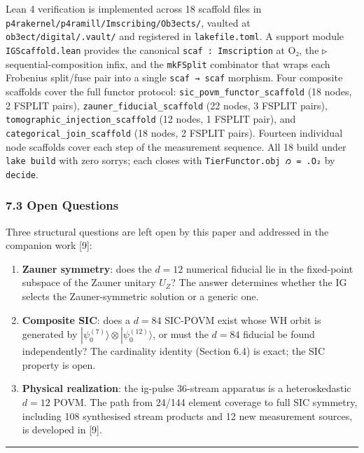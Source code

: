 Lean 4 verification is implemented across 18 scaffold files in
\texttt{p4rakernel/p4ramill/Imscribing/Ob3ects/}, vaulted at
\texttt{ob3ect/digital/.vault/} and registered in
\texttt{lakefile.toml}. A support module \texttt{IGScaffold.lean}
provides the canonical \texttt{scaf\ :\ Imscription} at O₂, the
\texttt{▷} sequential-composition infix, and the \texttt{mkFSplit}
combinator that wraps each Frobenius split/fuse pair into a single
\texttt{scaf\ →\ scaf} morphism. Four composite scaffolds cover the full
functor protocol: \texttt{sic\_povm\_functor\_scaffold} (18 nodes, 2
FSPLIT pairs), \texttt{zauner\_fiducial\_scaffold} (22 nodes, 3 FSPLIT
pairs), \texttt{tomographic\_injection\_scaffold} (12 nodes, 1 FSPLIT
pair), and \texttt{categorical\_join\_scaffold} (18 nodes, 2 FSPLIT
pairs). Fourteen individual node scaffolds cover each step of the
measurement sequence. All 18 build under \texttt{lake\ build} with zero
sorrys; each closes with \texttt{TierFunctor.obj\ 𐑼\ =\ .O₂} by
\texttt{decide}.

\hypertarget{open-questions}{%
\subsubsection{7.3 Open Questions}\label{open-questions}}

Three structural questions are left open by this paper and addressed in
the companion work {[}9{]}:

\begin{enumerate}
\def\labelenumi{\arabic{enumi}.}
\item
  \textbf{Zauner symmetry}: does the \(d=12\) numerical fiducial lie in
  the fixed-point subspace of the Zauner unitary \(U_Z\)? The answer
  determines whether the IG selects the Zauner-symmetric solution or a
  generic one.
\item
  \textbf{Composite SIC}: does a \(d=84\) SIC-POVM exist whose WH orbit
  is generated by
  \(|\psi_0^{(7)}\rangle \otimes |\psi_0^{(12)}\rangle\), or must the
  \(d=84\) fiducial be found independently? The cardinality identity
  (Section 6.4) is exact; the SIC property is open.
\item
  \textbf{Physical realization}: the ig-pulse 36-stream apparatus is a
  heteroskedastic \(d=12\) POVM. The path from 24/144 element coverage
  to full SIC symmetry, including 108 synthesised stream products and 12
  new measurement sources, is developed in {[}9{]}.
\end{enumerate}

\begin{center}\rule{0.5\linewidth}{0.5pt}\end{center}

